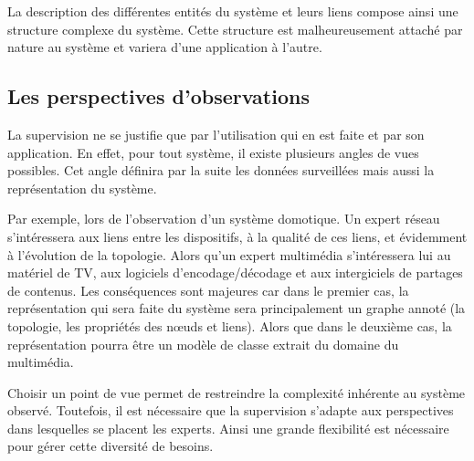 La description des différentes entités du système et leurs liens compose ainsi une structure complexe du système. Cette structure est malheureusement attaché par nature au système et variera d'une application à l'autre.

\subsection{Les perspectives d'observations}\label{sec:intro:problematique:observation}
La supervision ne se justifie que par l'utilisation qui en est faite et par son application. En effet, pour tout système, il existe plusieurs angles de vues possibles. Cet angle définira par la suite les données surveillées mais aussi la représentation du système.

Par exemple, lors de l'observation d'un système domotique. Un expert réseau s'intéressera aux liens entre les dispositifs, à la qualité de ces liens, et évidemment à l'évolution de la topologie. Alors qu'un expert multimédia s'intéressera lui au matériel de TV, aux logiciels d'encodage/décodage et aux intergiciels de partages de contenus. Les conséquences sont majeures car dans le premier cas, la représentation qui sera faite du système sera principalement un graphe annoté (la topologie, les propriétés des nœuds et liens). Alors que dans le deuxième cas, la représentation pourra être un modèle de classe extrait du domaine du multimédia.

Choisir un point de vue permet de restreindre la complexité inhérente au système observé. Toutefois, il est nécessaire que la supervision s'adapte aux perspectives dans lesquelles se placent les experts. Ainsi une grande flexibilité est nécessaire pour gérer cette diversité de besoins.

